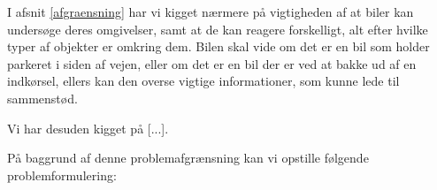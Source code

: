 I afsnit \ref{afgraensning} har vi kigget nærmere på vigtigheden af at biler kan undersøge deres omgivelser, samt at de kan reagere forskelligt, alt efter hvilke typer af objekter er omkring dem. Bilen skal vide om det er en bil som holder parkeret i siden af vejen, eller om det er en bil der er ved at bakke ud af en indkørsel, ellers kan den overse vigtige informationer, som kunne lede til sammenstød. 

Vi har desuden kigget på [...]. 

På baggrund af denne problemafgrænsning kan vi opstille følgende problemformulering:

\vspace{10 mm}
\noindent{}

\vspace{10 mm}
